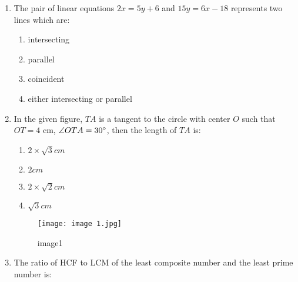 \documentclass{article}
\begin{document}
\begin{enumerate}
    \item The pair of linear equations $2x = 5y + 6$ and $15y = 6x - 18$ represents two lines which are:
    \begin{enumerate}
        \item intersecting
        \item parallel
        \item coincident
        \item either intersecting or parallel
    \end{enumerate}
    
    \item In the given figure, $TA$ is a tangent to the circle with center $O$ such that $OT = 4$ cm, $\angle OTA = 30\degree$, then the length of $TA$ is:
    \begin{enumerate}
        \item $2 \times \sqrt{3} cm$
        \item $2 cm $
        \item $2 \times \sqrt{2} cm$
        \item $\sqrt{3}cm$
    \end{enumerate}
\begin{figure}[h!]
\centering
\texttt{[image: image 1.jpg]}
\label{fig:image1}
	\caption{image1}
\end{figure}

\item The ratio of HCF to LCM of the least composite number and the least prime number is:


\end{enumerate}
\end{document}
